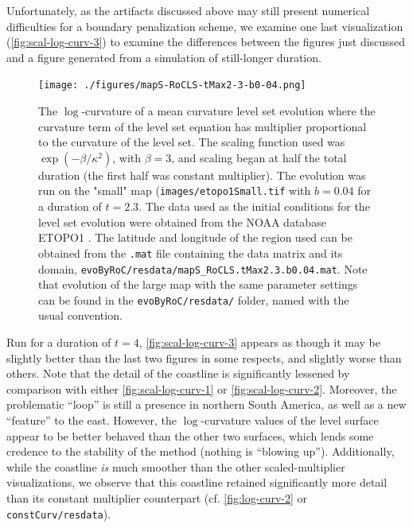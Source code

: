 \documentclass{article}
\begin{document}
Unfortunately, as the artifacts discussed above may still present
numerical difficulties for a boundary penalization scheme, we
examine one last visualization (\autoref{fig:scal-log-curv-3}) to
examine the differences between the figures just discussed and a
figure generated from a simulation of still-longer duration. 

\begin{figure}[h]
  \centering
  \texttt{[image: ./figures/mapS-RoCLS-tMax2-3-b0-04.png]}
  \caption{The $\log$-curvature of a mean curvature level set
    evolution where the curvature term of the level set equation
    has multiplier proportional to the curvature of the level
    set. The scaling function used was $\exp (-\beta/\kappa^2)$,
    with $\beta = 3$, and scaling began at half the total duration
    (the first half was constant multiplier). The evolution was
    run on the "small" map (\texttt{images/etopo1Small.tif} with
    $b = 0.04$ for a duration of $t = 2.3$. The data used as the
    initial conditions for the level set evolution were obtained
    from the NOAA database ETOPO1 \cite{etopo1}. The latitude and
    longitude of the region used can be obtained from the
    \texttt{.mat} file containing the data matrix and its domain,
    \texttt{evoByRoC/resdata/mapS\_RoCLS.tMax2.3.b0.04.mat}. Note
    that evolution of the large map with the same parameter
    settings can be found in the \texttt{evoByRoC/resdata/}
    folder, named with the usual convention. }
\label{fig:scal-log-curv-2}
\end{figure}

Run for a duration of $t = 4$, \autoref{fig:scal-log-curv-3}
appears as though it may be slightly better than the last two
figures in some respects, and slightly worse than others. Note
that the detail of the coastline is significantly lessened by
comparison with either \autoref{fig:scal-log-curv-1} or
\autoref{fig:scal-log-curv-2}. Moreover, the problematic ``loop''
is still a presence in northern South America, as well as a new
``feature'' to the east. However, the $\log$-curvature values of
the level surface appear to be better behaved than the other two
surfaces, which lends some credence to the stability of the method
(nothing is ``blowing up''). Additionally, while the coastline
\emph{is} much smoother than the other scaled-multiplier
visualizations, we observe that this coastline retained
significantly more detail than its constant multiplier counterpart
(cf. \autoref{fig:log-curv-2} or \texttt{constCurv/resdata}).
\end{document}
